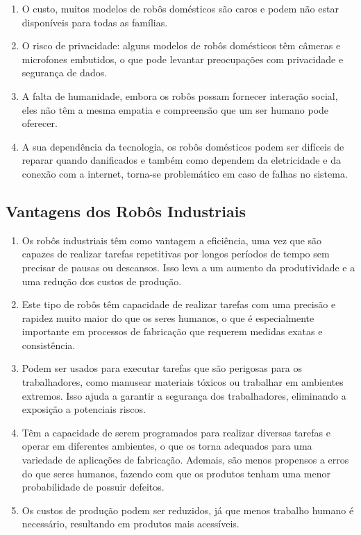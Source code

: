 \documentclass[10pt]{article}
\begin{document}
\begin{enumerate}
    \item O custo, muitos modelos de robôs domésticos são caros e podem não estar disponíveis para todas as famílias.
    \item O risco de privacidade: alguns modelos de robôs domésticos têm câmeras e microfones embutidos, o que pode levantar preocupações com privacidade e segurança de dados.
    \item A falta de humanidade, embora os robôs possam fornecer interação social, eles não têm a mesma empatia e compreensão que um ser humano pode oferecer.
    \item A sua dependência da tecnologia, os robôs domésticos podem ser difíceis de reparar quando danificados e também como dependem da eletricidade e da conexão com a internet, torna-se problemático em caso de falhas no sistema.
\end{enumerate}

\subsection{Vantagens dos Robôs Industriais\cite{stevens_2022}}

\begin{enumerate}
    \item Os robôs industriais têm como vantagem a eficiência, uma vez que são capazes de realizar tarefas repetitivas por longos períodos de tempo sem precisar de pausas ou descansos. Isso leva a um aumento da produtividade e a uma redução dos custos de produção.
    \item Este tipo de robôs têm capacidade de realizar tarefas com uma precisão e rapidez muito maior do que os seres humanos, o que é especialmente importante em processos de fabricação que requerem medidas exatas e consistência.
    \item Podem ser usados para executar tarefas que são perigosas para os trabalhadores, como manusear materiais tóxicos ou trabalhar em ambientes extremos. Isso ajuda a garantir a segurança dos trabalhadores, eliminando a exposição a potenciais riscos.
    \item Têm a capacidade de serem programados para realizar diversas tarefas e operar em diferentes ambientes, o que os torna adequados para uma variedade de aplicações de fabricação. Ademais, são menos propensos a erros do que seres humanos, fazendo com que os produtos tenham uma menor probabilidade de possuir defeitos.
    \item Os custos de produção podem ser reduzidos, já que menos trabalho humano é necessário, resultando em produtos mais acessíveis.
\end{enumerate}
\end{document}
